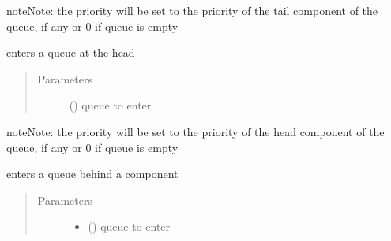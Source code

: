 \documentclass[letterpaper,10pt,english]{sphinxmanual}
\begin{document}
\begin{fulllineitems}
\begin{fulllineitems}
\begin{quote}
\begin{description}
\end{description}\end{quote}

\begin{sphinxadmonition}{note}{Note:}
the priority will be set to
the priority of the tail component of the queue, if any
or 0 if queue is empty
\end{sphinxadmonition}

\end{fulllineitems}


\begin{fulllineitems}
\label{\detokenize{Reference:salabim.Component.enter_at_head}}
enters a queue at the head
\begin{quote}\begin{description}
\item[{Parameters}] \leavevmode
{} ({\hyperref[\detokenize{Reference:salabim.Queue}]{}}) \textendash{} queue to enter

\end{description}\end{quote}

\begin{sphinxadmonition}{note}{Note:}
the priority will be set to
the priority of the head component of the queue, if any
or 0 if queue is empty
\end{sphinxadmonition}

\end{fulllineitems}


\begin{fulllineitems}
\label{\detokenize{Reference:salabim.Component.enter_behind}}
enters a queue behind a component
\begin{quote}\begin{description}
\item[{Parameters}] \leavevmode\begin{itemize}
\item {} 
 ({\hyperref[\detokenize{Reference:salabim.Queue}]{}}) \textendash{} queue to enter


\end{itemize}
\end{description}
\end{quote}
\end{fulllineitems}
\end{fulllineitems}
\end{document}
